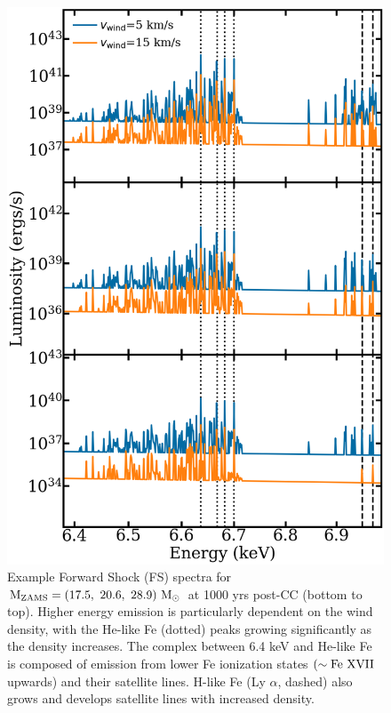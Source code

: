 \documentclass[twocolumn]{aastex631}
\begin{document}
\begin{figure}[htb!]
    \centering
    \includegraphics[scale=0.24]{example_spectra.png}
    \caption{Example Forward Shock (FS) spectra for $\rm M_{\rm ZAMS} = (17.5,~20.6,~28.9)~ \rm M_{\odot}$ at 1000 yrs post-CC (bottom to top). Higher energy emission is particularly dependent on the wind density, with the He-like Fe (dotted) peaks growing significantly as the density increases. The complex between 6.4 keV and He-like Fe is composed of emission from lower Fe ionization states $(\sim \rm Fe~XVII$  upwards) and their satellite lines.  H-like Fe (Ly $\alpha$, dashed) also grows and develops satellite lines with increased density.}
    \label{fig:example-spec}
\end{figure}
\end{document}
